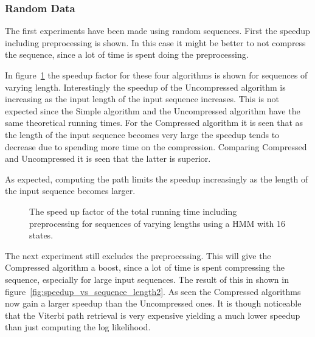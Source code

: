 %   

\subsubsection{Random Data}

The first experiments have been made using random sequences. First the speedup
including preprocessing is shown. In this case it might be better to not
compress the sequence, since a lot of time is spent doing the
preprocessing.

In figure~\ref{fig:speedup_vs_sequence_length} the speedup factor for these
four algorithms is shown for sequences of varying length. Interestingly the
speedup of the Uncompressed algorithm is increasing as the input length of the
input sequence increases. This is not expected since the Simple algorithm and
the Uncompressed algorithm have the same theoretical running times. For the
Compressed algorithm it is seen that as the length of the input sequence
becomes very large the speedup tends to decrease due to spending more time on
the compression.  Comparing Compressed and Uncompressed it is seen that the latter
is superior.

As expected, computing the path limits the speedup increasingly as the length
of the input sequence becomes larger. 

\begin{figure}
  \centering
  
  \caption{The speed up factor of the total running time including preprocessing
    for sequences of varying lengths using a HMM with 16 states.}
  \label{fig:speedup_vs_sequence_length}
\end{figure}

The next experiment still excludes the preprocessing. This will give the
Compressed algorithm a boost, since a lot of time is spent compressing the
sequence, especially for large input sequences. The result of this in shown in
figure~\ref{fig:speedup_vs_sequence_length2}. As seen the Compressed algorithms
now gain a larger speedup than the Uncompressed ones. It is though noticeable
that the Viterbi path retrieval is very expensive yielding a much lower speedup
than just computing the log likelihood.

